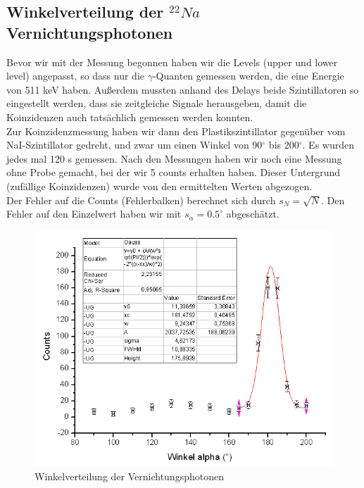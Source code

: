\subsection{Winkelverteilung der $^{22}Na$ Vernichtungsphotonen}

Bevor wir mit der Messung begonnen haben wir die Levels (upper und lower level) angepasst, so dass nur die $\gamma$-Quanten gemessen werden, die eine Energie von 511 keV haben. Außerdem mussten anhand des Delays beide Szintillatoren so eingestellt werden, dass sie zeitgleiche Signale herausgeben, damit die Koinzidenzen auch tatsächlich gemessen werden konnten.\\

Zur Koinzidenzmessung haben wir dann den Plastikszintillator gegenüber vom NaI-Szintillator gedreht, und zwar um einen Winkel von 90$^\circ$ bis 200$^\circ$. Es wurden jedes mal 120 s gemessen. Nach den Messungen haben wir noch eine Messung ohne Probe gemacht, bei der wir 5 counts erhalten haben. Dieser Untergrund (zufällige Koinzidenzen) wurde von den ermittelten Werten abgezogen.\\

Der Fehler auf die Counts (Fehlerbalken) berechnet sich durch $s_N = \sqrt{N}$. Den Fehler auf den Einzelwert haben wir mit $s_\alpha = 0.5^\circ$ abgeschätzt.

\begin{figure}[H]
\centering \includegraphics[width = \textwidth]{auswertung/Winkel.png}
\caption{Winkelverteilung der Vernichtungsphotonen}
\end{figure}

